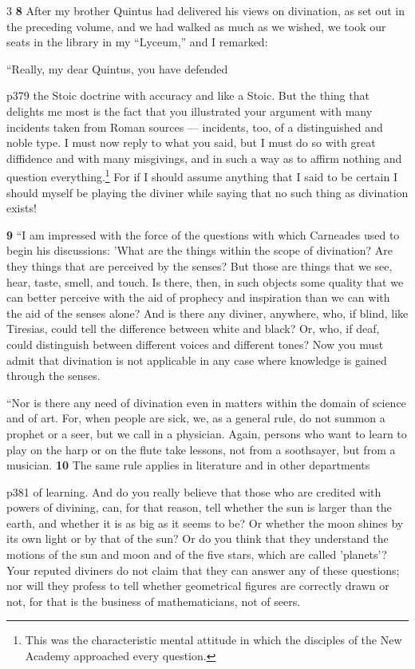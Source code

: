 3
\textbf{8} After my brother Quintus had delivered his views on divination, as set out in the preceding volume, and we had walked as much as we wished, we took our seats in the library in my ``Lyceum,'' and I remarked:

``Really, my dear Quintus, you have defended

p379 the Stoic doctrine with accuracy and like a Stoic. But the thing that delights me most is the fact that you illustrated your argument with many incidents taken from Roman sources \texthebrew{—} incidents, too, of a distinguished and noble type. I must now reply to what you said, but I must do so with great diffidence and with many misgivings, and in such a way as to affirm nothing and question everything.\texthebrew{}\footnote{This was the characteristic mental attitude in which the disciples of the New Academy approached every question.

} For if I should assume anything that I said to be certain I should myself be playing the diviner while saying that no such thing as divination exists!

\textbf{9} ``I am impressed with the force of the questions with which Carneades used to begin his discussions: 'What are the things within the scope of divination? Are they things that are perceived by the senses? But those are things that we see, hear, taste, smell, and touch. Is there, then, in such objects some quality that we can better perceive with the aid of prophecy and inspiration than we can with the aid of the senses alone? And is there any diviner, anywhere, who, if blind, like Tiresias, could tell the difference between white and black? Or, who, if deaf, could distinguish between different voices and different tones? Now you must admit that divination is not applicable in any case where knowledge is gained through the senses.

``Nor is there any need of divination even in matters within the domain of science and of art. For, when people are sick, we, as a general rule, do not summon a prophet or a seer, but we call in a physician. Again, persons who want to learn to play on the harp or on the flute take lessons, not from a soothsayer, but from a musician. \textbf{10} The same rule applies in literature and in other departments

p381 of learning. And do you really believe that those who are credited with powers of divining, can, for that reason, tell whether the sun is larger than the earth, and whether it is as big as it seems to be? Or whether the moon shines by its own light or by that of the sun? Or do you think that they understand the motions of the sun and moon and of the five stars, which are called 'planets'? Your reputed diviners do not claim that they can answer any of these questions; nor will they profess to tell whether geometrical figures are correctly drawn or not, for that is the business of mathematicians, not of seers.

